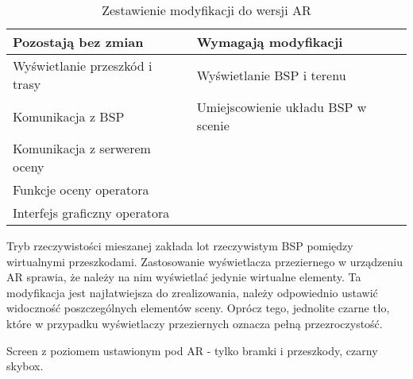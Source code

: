 \begin{table}[!h] \centering
    \caption{Zestawienie modyfikacji do wersji AR}
    \label{tab:modyfikacje-ar}

    \begin{tabular} {| l | l |} \hline
        \textbf{Pozostają bez zmian} & \textbf{Wymagają modyfikacji} \\ \hline\hline
        Wyświetlanie przeszkód i trasy & Wyświetlanie BSP i terenu \\ \hline
        Komunikacja z BSP & Umiejscowienie układu BSP w scenie \\ \hline
        Komunikacja z serwerem oceny &  \\ \hline
        Funkcje oceny operatora &  \\ \hline
        Interfejs graficzny operatora &  \\ \hline
    \end{tabular}
\end{table}

Tryb rzeczywistości mieszanej zakłada lot rzeczywistym BSP pomiędzy wirtualnymi przeszkodami. Zastosowanie wyświetlacza przeziernego w urządzeniu AR sprawia, że należy na nim wyświetlać jedynie wirtualne elementy. Ta modyfikacja jest najłatwiejsza do zrealizowania, należy odpowiednio ustawić widoczność poszczególnych elementów sceny. Oprócz tego, jednolite czarne tło, które w przypadku wyświetlaczy przeziernych oznacza pełną przezroczystość.

\begin{todo}
    Screen z poziomem ustawionym pod AR - tylko bramki i przeszkody, czarny skybox.
\end{todo}

